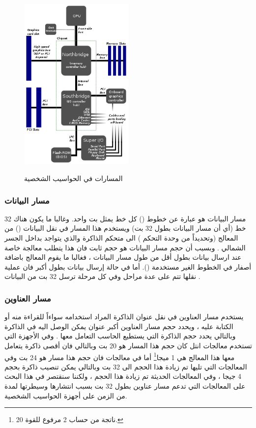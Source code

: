 \documentclass[document.tex]{subfiles}
\begin{document}
\begin{figure}[h!]
  \caption{المسارات في الحواسيب الشخصية }
  \centering
   \includegraphics[width=0.5\textwidth]{../img/fsb}
  \label{fig:fsb} 
\end{figure}

\subsubsection{مسار البيانات }
مسار البيانات هو عبارة عن خطوط () كل خط يمثل بت واحد. وغالبا ما يكون هناك 32 خط (أي أن مسار البيانات بطول 32 بت) ويستخدم هذا المسار في نقل البيانات () من المعالج (وتحديداً من وحدة التحكم ) الى متحكم الذاكرة  والذي يتواجد بداخل الجسر الشمالي . وبسبب أن حجم مسار البيانات هو حجم ثابت فان هذا يتطلب معالجة خاصة عند ارسال بيانات بطول أقل من طول مسار البيانات ، فغالبا ما يقوم المعالج باضافة أصفار في الخطوط الغير مستخدمة (). أما في حالة إرسال بيانات بطول أكبر فان عملية نقلها تتم على عدة مراحل وفي كل مرحلة ترسل 32 بت من البيانات .

\subsubsection{مسار العناوين }
يستخدم مسار العناوين في نقل عنوان الذاكرة المراد استخدامه سواءاً للقراءة منه أو الكتابة عليه ، ويحدد حجم مسار العناوين أكبر عنوان يمكن الوصل اليه في الذاكرة وبالتالي يحدد حجم الذاكرة التي يستطيع الحاسب التعامل معها . وفي الأجهزة التي تستخدم معالجات انتل  كان حجم هذا المسار هو 20 بت وبالتالي فان أقصى ذاكرة يتعامل معها هذا المعالج هي 1 ميجا\footnote{ناتجة من حساب 2 مرفوع للقوة 20.} أما في معالجات  فان حجم هذا مسار هو 24 بت وفي المعالجات التي تليها تم زيادة هذا الحجم الى 32 بت وبالتالي يمكن تنصيب ذاكرة بحجم 4 جيجا ، وفي المعالجات الحديثة تم زيادة هذا الحجم ، ولكننا سنقتصر في هذا البحث على المعالجات التي تدعم مسار عناوين بطول 32 بت بسبب انتشارها وسيطرتها لمدة من الزمن على أجهزة الحواسيب الشخصية.
\end{document}
